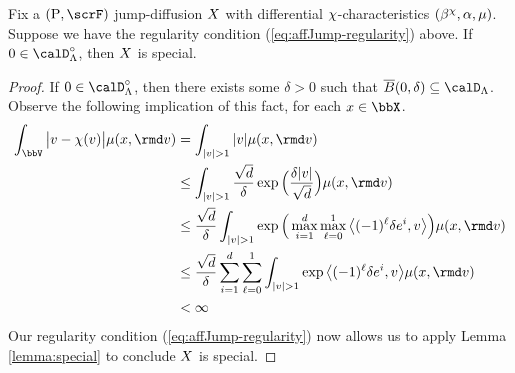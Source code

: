 \begin{proposition}
  \label{proposition:LK-special}
  Fix a $(\Prb, \scrF)$ jump-diffusion $X$ with differential $\chi$-characteristics $(\beta^\chi, \alpha, \mu)$.
  Suppose we have the regularity condition (\ref{eq:affJump-regularity}) above.
  If $0 \in \odeSpace^\circ$, then $X$ is special.
\end{proposition}
\begin{proof}
  \label{proof:proposition:LK-special}
  If $0 \in \odeSpace^\circ$, then there exists some $\delta > 0$ such that $\closedBall{0}{\delta} \subseteq \odeSpace$.
  Observe the following implication of this fact, for each $\stateVar \in \stateSpace$.
  \begin{align*}
    \int_{\vecSpace} \big|\markVar - \trunc(\markVar)\big| \affJump(\stateVar, \rmd\markVar)
    &= \int_{|\markVar|>1} |\markVar| \affJump(\stateVar, \rmd\markVar) \\
    &\leq \int_{|\markVar|>1} \frac{\sqrt{d}}{\delta} \exp\Big(\frac{\delta|\markVar|}{\sqrt d} \Big) \affJump(\stateVar, \rmd\markVar) \\
    &\leq \frac{\sqrt d}{\delta} \int_{|\markVar|>1} \exp\Big(\max_{i=1}^d \max_{\ell=0}^1 \bprj{(-1)^\ell \delta \basisVec^i}{\markVar} \Big) \affJump(\stateVar,\rmd\markVar) \\
    &\leq \frac{\sqrt d}{\delta} \sum_{i=1}^d \sum_{\ell=0}^1 \int_{|\markVar|>1} \exp\bprj{(-1)^\ell \delta \basisVec^i}{\markVar} \affJump(\stateVar,\rmd\markVar) \\
    &< \infty
  \end{align*}
  Our regularity condition (\ref{eq:affJump-regularity}) now allows us to apply Lemma \ref{lemma:special} to conclude $X$ is special.
\end{proof}
